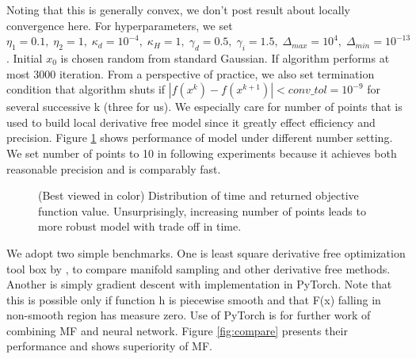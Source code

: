 \documentclass[10pt, oneside]{article}
\begin{document}
Noting that this is generally convex, we don't post result about locally convergence here. For hyperparameters, we set $\eta_1=0.1,\;\eta_2=1,\;\kappa_d=10^{-4},\;\kappa_H=1,\;\gamma_d=0.5,\;\gamma_i=1.5,\;\Delta_{max}=10^4,\;\Delta_{min}=10^{-13}$. Initial $x_0$ is chosen random from standard Gaussian. If algorithm performs at most 3000 iteration. From a perspective of practice, we also set termination condition that algorithm shuts if $\left|f(x^k)-f(x^{k+1})\right|<conv\_tol=10^{-9}$ for several successive k (three for us). We especially care for number of points that is used to build local derivative free model since it greatly effect efficiency and precision. Figure \ref{fig:npt} shows performance of model under different number setting. We set number of points to 10 in following experiments because it achieves both reasonable precision and is comparably fast. 

\begin{figure}[H]
\centering
{}
   \caption{(Best viewed in color) Distribution of time and returned objective function value. Unsurprisingly, increasing number of points leads to more robust model with trade off in time. }
   \label{fig:npt}
  \end{figure}

We adopt two simple benchmarks. One is least square derivative free optimization tool box by \cite{dfols}, to compare manifold sampling and other derivative free methods. Another is simply gradient descent with implementation in PyTorch. Note that this is possible only if function h is piecewise smooth and that F(x) falling in non-smooth region has measure zero. Use of PyTorch is for further work of combining MF and neural network. Figure \ref{fig:compare} presents their performance and shows superiority of MF. 
\end{document}
